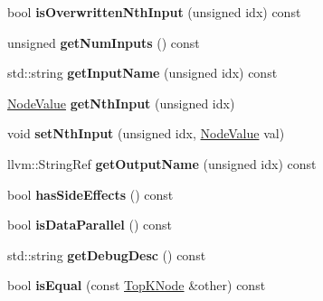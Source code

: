 \begin{DoxyCompactItemize}
bool {\bfseries is\+Overwritten\+Nth\+Input} (unsigned idx) const
\item 
\mbox{\label{classglow_1_1_top_k_node_ac7ca648391288d451a21561c4b8e6c7a}} 
unsigned {\bfseries get\+Num\+Inputs} () const
\item 
\mbox{\label{classglow_1_1_top_k_node_a5c78e5dd3f20763ffe9efcbcbc4a3e4e}} 
std\+::string {\bfseries get\+Input\+Name} (unsigned idx) const
\item 
\mbox{\label{classglow_1_1_top_k_node_a1d1e7a3742ae7e923977db6ed63b5b50}} 
\hyperlink{structglow_1_1_node_value}{Node\+Value} {\bfseries get\+Nth\+Input} (unsigned idx)
\item 
\mbox{\label{classglow_1_1_top_k_node_a04b65393949b4e95e956a48473255b83}} 
void {\bfseries set\+Nth\+Input} (unsigned idx, \hyperlink{structglow_1_1_node_value}{Node\+Value} val)
\item 
\mbox{\label{classglow_1_1_top_k_node_a374c6695800c4d32e6044368dc968f08}} 
llvm\+::\+String\+Ref {\bfseries get\+Output\+Name} (unsigned idx) const
\item 
\mbox{\label{classglow_1_1_top_k_node_a692b79bf0273484c4df0af54dd574531}} 
bool {\bfseries has\+Side\+Effects} () const
\item 
\mbox{\label{classglow_1_1_top_k_node_aaf051a96cb2cca413ee7d1d884090917}} 
bool {\bfseries is\+Data\+Parallel} () const
\item 
\mbox{\label{classglow_1_1_top_k_node_a9d30a5014a73b01a3b8455e1e40df0f8}} 
std\+::string {\bfseries get\+Debug\+Desc} () const
\item 
\mbox{\label{classglow_1_1_top_k_node_a049b98df3f8d13463af274c73fd1b8de}} 
bool {\bfseries is\+Equal} (const \hyperlink{classglow_1_1_top_k_node}{Top\+K\+Node} \&other) const
\item 
\mbox{\label{classglow_1_1_top_k_node_a4573e6a58b4cd449a4a83132eaa65ced}} 

\end{DoxyCompactItemize}

